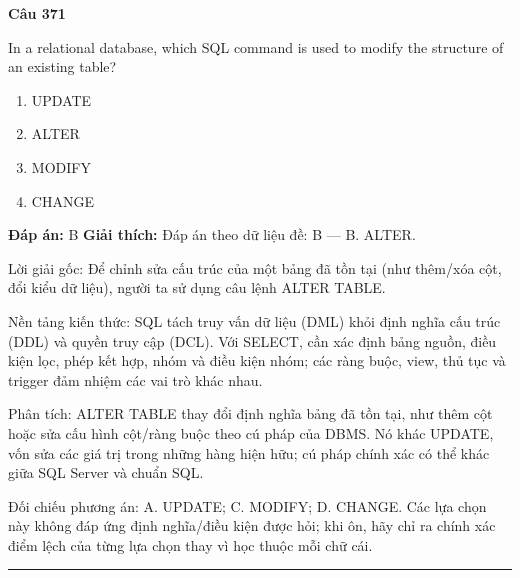 \documentclass[11pt,a4paper]{article}
\newenvironment{question}[1]{%
  \par\vspace{1em}\noindent\textbf{\large Câu #1}\par\vspace{0.4em}
}{%
  \par\vspace{1em}\hrule\vspace{0.6em}
}
\newenvironment{choices}{%
  \begin{enumerate}[label=\textbf{\Alph*.},leftmargin=2.2em,itemsep=2pt,topsep=3pt]
}{%
  \end{enumerate}
}
\newcommand{\choice}{\item}
\begin{document}
\begin{question}{371}
In a relational database, which SQL command is used to modify the structure of an existing table?
\begin{choices}
\choice UPDATE
\choice ALTER
\choice MODIFY
\choice CHANGE
\end{choices}
\textbf{Đáp án:} B
\textbf{Giải thích:} Đáp án theo dữ liệu đề: B — B. ALTER.

Lời giải gốc: Để chỉnh sửa cấu trúc của một bảng đã tồn tại (như thêm/xóa cột, đổi kiểu dữ liệu), người ta sử dụng câu lệnh ALTER TABLE.

Nền tảng kiến thức: SQL tách truy vấn dữ liệu (DML) khỏi định nghĩa cấu trúc (DDL) và quyền truy cập (DCL). Với SELECT, cần xác định bảng nguồn, điều kiện lọc, phép kết hợp, nhóm và điều kiện nhóm; các ràng buộc, view, thủ tục và trigger đảm nhiệm các vai trò khác nhau.

Phân tích: ALTER TABLE thay đổi định nghĩa bảng đã tồn tại, như thêm cột hoặc sửa cấu hình cột/ràng buộc theo cú pháp của DBMS. Nó khác UPDATE, vốn sửa các giá trị trong những hàng hiện hữu; cú pháp chính xác có thể khác giữa SQL Server và chuẩn SQL.

Đối chiếu phương án: A. UPDATE; C. MODIFY; D. CHANGE. Các lựa chọn này không đáp ứng định nghĩa/điều kiện được hỏi; khi ôn, hãy chỉ ra chính xác điểm lệch của từng lựa chọn thay vì học thuộc mỗi chữ cái.
\end{question}
\end{document}
